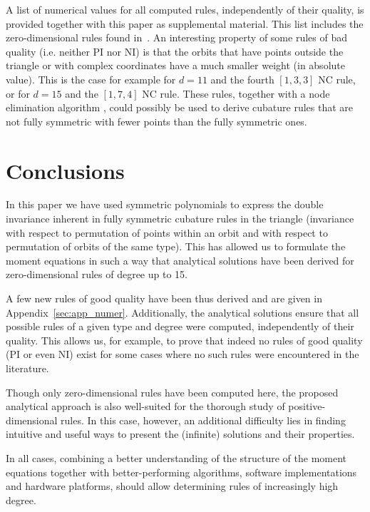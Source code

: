 \documentclass{article}
\begin{document}
A list of numerical values for all computed rules, independently of their quality, is provided together with this paper as supplemental material. This list includes the zero-dimensional rules found in~\citep{Stroud1971, Cowper1973, LynessJespersen1975, LaursenGellert1978, Dunavant1985}. An interesting property of some rules of bad quality (i.e. neither PI nor NI) is that the orbits that have points outside the triangle or with complex coordinates have a much smaller weight (in absolute value). This is the case for example for $d=11$ and the fourth $[1,3,3]$ NC rule, or for $d=15$ and the $[1,7,4]$ NC rule. These rules, together with a node elimination algorithm \citep{XiaoGimbutas2010}, could possibly be used to derive   cubature rules that are not fully symmetric with fewer points than the fully symmetric ones.





\section{Conclusions}

In this paper we have used symmetric polynomials to express the double invariance inherent in fully symmetric cubature rules in the triangle (invariance with respect to permutation of points within an orbit and with respect to permutation of orbits of the same type). This has allowed us to formulate the moment equations in such a way that analytical solutions have been derived for zero-dimensional rules of degree up to 15.

A few new rules of good quality have been thus derived and are given in Appendix~\ref{sec:app_numer}. Additionally, the analytical solutions ensure that all possible rules of a given type and degree were computed, independently of their quality. This allows us, for example, to prove that indeed no rules of good quality (PI or even NI) exist for some cases where no such rules were encountered in the literature.

Though only zero-dimensional rules have been computed here, the proposed analytical approach is also well-suited for the thorough study of positive-dimensional rules. In this case, however, an additional difficulty lies in finding intuitive and useful ways to present the (infinite) solutions and their properties.

In all cases, combining a better understanding of the structure of the moment equations together with better-performing algorithms, software implementations and hardware platforms, should allow determining rules of increasingly high degree.
\end{document}
